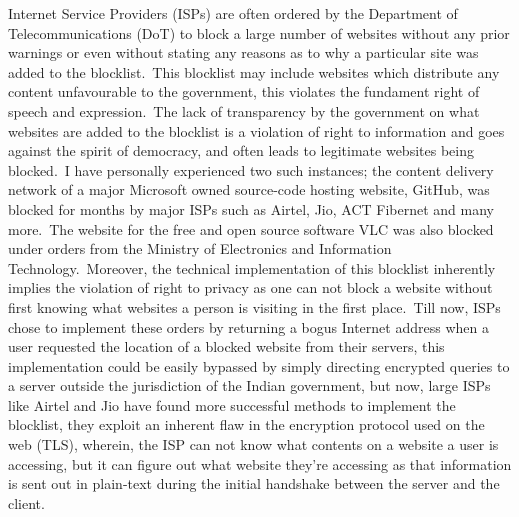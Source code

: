 \documentclass[11pt,a4paper,oneside]{scrarticle}
\begin{document}
    Internet Service Providers (ISPs) are often ordered by the Department of Telecommunications (DoT) to block a large
    number of websites without any prior warnings or even without stating any reasons as to why a particular site was
    added to the blocklist.\ This blocklist may include websites which distribute any content unfavourable to the
    government, this violates the fundament right of speech and expression.\ The lack of transparency by the government
    on what websites are added to the blocklist is a violation of right to information and goes against the spirit of
    democracy, and often leads to legitimate websites being blocked.\ I have personally experienced two such instances;
    the content delivery network of a major Microsoft owned source-code hosting website, GitHub, was blocked for months
    by major ISPs such as Airtel, Jio, ACT Fibernet and many more.\ The website for the free and open source software
    VLC was also blocked under orders from the Ministry of Electronics and Information Technology.\ Moreover, the
    technical implementation of this blocklist inherently implies the violation of right to privacy as one can not block
    a website without first knowing what websites a person is visiting in the first place.\ Till now, ISPs chose to
    implement these orders by returning a bogus Internet address when a user requested the location of a blocked
    website from their servers, this implementation could be easily bypassed by simply directing encrypted queries to a
    server outside the jurisdiction of the Indian government, but now, large ISPs like Airtel and Jio have found more
    successful methods to implement the blocklist, they exploit an inherent flaw in the encryption protocol used on the
    web (TLS), wherein, the ISP can not know what contents on a website a user is accessing, but it can figure out what
    website they're accessing as that information is sent out in plain-text during the initial handshake between the
    server and the client.
\end{document}
